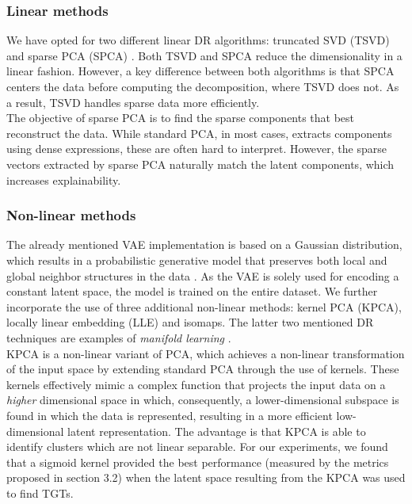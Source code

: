 \subsubsection{Linear methods}
We have opted for two different linear DR algorithms: truncated SVD (TSVD) and sparse PCA (SPCA) \cite{doi:10.1198/106186006X113430}. Both TSVD and SPCA reduce the dimensionality in a linear fashion. However, a key difference between both algorithms is that SPCA centers the data before computing the decomposition, where TSVD does not. As a result, TSVD handles sparse data more efficiently.\\

The objective of sparse PCA is to find the sparse components that best reconstruct the data. While standard PCA, in most cases, extracts components using dense expressions, these are often hard to interpret. However, the sparse vectors extracted by sparse PCA naturally match the latent components, which increases explainability.

\subsubsection{Non-linear methods}
The already mentioned VAE implementation is based on a Gaussian distribution, which results in a probabilistic generative model that preserves both local and global neighbor structures in the data \cite{ding2018interpretable}. As the VAE is solely used for encoding a constant latent space, the model is trained on the entire dataset. We further incorporate the use of three additional non-linear methods: kernel PCA (KPCA), locally linear embedding (LLE) \cite{Roweis2323} and isomaps. The latter two mentioned DR techniques are examples of \textit{manifold learning} \cite{cayton2005algorithms}.\\

KPCA \cite{10.1007/BFb0020217} is a non-linear variant of PCA, which achieves a non-linear transformation of the input space by extending standard PCA through the use of kernels. These kernels effectively mimic a complex function that projects the input data on a \textit{higher} dimensional space in which, consequently, a lower-dimensional subspace is found in which the data is represented, resulting in a more efficient low-dimensional latent representation. The advantage is that KPCA is able to identify clusters which are not linear separable. For our experiments, we found that a sigmoid kernel provided the best performance (measured by the metrics proposed in section 3.2) when the latent space resulting from the KPCA was used to find TGTs.\\
    
